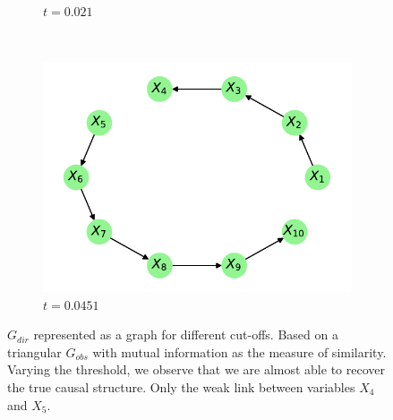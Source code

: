 \documentclass[../Thesis.tex]{subfiles}
\begin{document}
\begin{figure}[H]
\begin{subfigure}[t]{0.49\textwidth}
        \caption{$t = 0.021$}
    \end{subfigure}
    \\[\baselineskip]
    \begin{subfigure}[t]{0.49\textwidth}
        \centering
        \includegraphics[width=.95\linewidth]{figures/Gaussian Chain Theoretical/Chain graph from triangular G obs - MI - cutoff 4_51e-2.pdf}
        \caption{$t = 0.0451$}
    \end{subfigure}
    \caption{$G_{dir}$ represented as a graph for different cut-offs. Based on a triangular $G_{obs}$ with mutual information as the measure of similarity. Varying the threshold, we observe that we are almost able to recover the true causal structure. Only the weak link between variables $X_4$ and $X_5$.}
    \label{fig:Gaussian chain symmetric G_obs using mutual information different cutoff}
\end{figure}



\newpage
\end{document}
